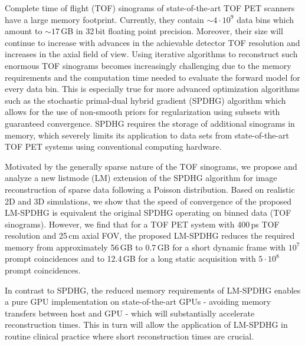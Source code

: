 Complete time of flight (TOF) sinograms of state-of-the-art TOF PET scanners have a large memory 
footprint.
Currently, they contain ${\sim}4{\cdot}10^9$ data bins which amount to ${\sim}17$\,GB 
in 32\,bit floating point precision.
Moreover, their size will continue to increase with advances in the 
achievable detector TOF resolution and increases in the axial field of view.
Using iterative algorithms to reconstruct such enormous TOF sinograms becomes increasingly
challenging due to the memory requirements and the computation time needed to evaluate the
forward model for every data bin.
This is especially true for more advanced optimization algorithms such as the
stochastic primal-dual hybrid gradient (SPDHG) algorithm which allows for the use of non-smooth priors
for regularization using subsets with guaranteed convergence.
SPDHG requires the storage of additional sinograms in memory, which severely limits
its application to data sets from state-of-the-art TOF PET systems using conventional
computing hardware.

Motivated by the generally sparse nature of the TOF sinograms, we propose and analyze a new 
listmode (LM) extension of the SPDHG algorithm  for image reconstruction of sparse data 
following a Poisson distribution.
Based on realistic 2D and 3D simulations, we show that the speed of convergence of the proposed 
LM-SPDHG is equivalent the original SPDHG operating on binned data (TOF sinograms).
However, we find that for a TOF PET system with 400\,ps TOF resolution and 25\,cm axial FOV,
the proposed LM-SPDHG reduces the required memory from approximately 56\,GB to
0.7\,GB for a short dynamic frame with $10^7$ prompt coincidences and to 12.4\,GB for a long 
static acquisition with $5\cdot10^8$ prompt coincidences.

In contrast to SPDHG, the reduced memory requirements of LM-SPDHG enables 
a pure GPU implementation on state-of-the-art GPUs - avoiding memory transfers
between host and GPU - which will substantially accelerate reconstruction times.
This in turn will allow the application of LM-SPDHG in routine clinical practice where short
reconstruction times are crucial.
